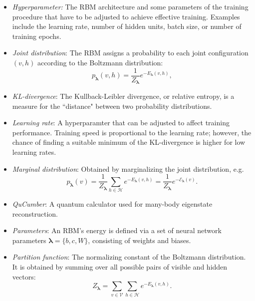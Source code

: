 \documentclass[submission, Phys]{SciPost}
\begin{document}
\begin{itemize}
	\item{\it Hyperparameter:} The RBM architecture and some parameters of the training procedure that have to be adjusted to achieve effective training. Examples include the learning rate, number of hidden units, batch size, or number of training epochs.

	\item {\it Joint distribution}: The RBM assigns a probability to each joint configuration $(v,h)$ according to the Boltzmann distribution:
	      \begin{equation}
		      p_{\bm{\lambda}}(v,h) = \frac{1}{Z_{\bm{\lambda}}} e^{-E_{\bm{\lambda}}(v,h)},
	      \end{equation}
	      
	      \item{\it KL-divergence}: The Kullback-Leibler divergence, or relative entropy, is a measure for the ``distance" between two probability distributions.

\item{\it Learning rate}: A hyperparamter that can be adjusted to affect training performance.  Training speed is proportional to the learning rate; however, the chance of finding a suitable minimum of the KL-divergence is higher for low learning rates.


	\item {\it Marginal distribution}: Obtained by marginalizing the joint distribution, e.g.
	      \begin{equation}
		      \label{Eq:marginal_distribution}
		      p_{\bm{\lambda}}(v) = \frac{1}{Z_{\bm{\lambda}}} \sum\limits_{h\in \mathcal{H}} e^{-E_{\bm{\lambda}}(v,h)} = \frac{1}{Z_{\bm{\lambda}}} e^{- \mathcal{E}_{\bm{\lambda}}(v)}.
	      \end{equation}

	\item {\it QuCumber}: A quantum calculator used for many-body eigenstate reconstruction.

	\item {\it Parameters}: An RBM's energy is defined via a set of neural network parameters $\bm{\lambda} = \{b,c,W\}$, consisting of weights and biases.

	\item {\it Partition function}: The normalizing constant of the Boltzmann distribution. It is obtained by summing over all possible pairs of visible and hidden vectors:
	      \begin{equation}
		      Z_{\bm{\lambda}} = \sum\limits_{v\in \mathcal{V}}\sum\limits_{h\in \mathcal{H}} e^{-E_{\bm{\lambda}}(v,h)}.
	      \end{equation}


\end{itemize}
\end{document}
